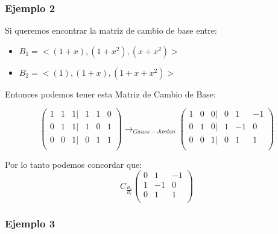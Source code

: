 \documentclass[12pt]{report}                                %
\begin{document}
        \subsubsection{Ejemplo 2}

        Si queremos encontrar la matriz de cambio de base entre:
        \begin{itemize}
            \item $B_1 = < (1+x), (1+x^2), (x+x^2) >$ 
            \item $B_2 = < (1), (1+x), (1+x+x^2) >$ 
        \end{itemize}

        Entonces podemos tener esta Matriz de Cambio de Base:

        \begin{equation*}
            \begin{pmatrix}
                1 & 1 & 1 | & 1 & 1 & 0 \\
                0 & 1 & 1 | & 1 & 0 & 1 \\
                0 & 0 & 1 | & 0 & 1 & 1 \\
            \end{pmatrix}
            \to_{Gauss-Jordan}
            \begin{pmatrix}
                1 & 0 & 0 | & 0 & 1 & -1 \\
                0 & 1 & 0 | & 1 & -1 & 0 \\
                0 & 0 & 1 | & 0 & 1 & 1 \\
            \end{pmatrix}
        \end{equation*}

        Por lo tanto podemos concordar que:
        \begin{equation*}
            C_{\frac{B_2}{B_1}}
            \begin{pmatrix}
                0 & 1 & -1 \\
                1 & -1 & 0 \\
                0 & 1 & 1  \\
            \end{pmatrix}
        \end{equation*}



        \subsubsection{Ejemplo 3}
\end{document}
